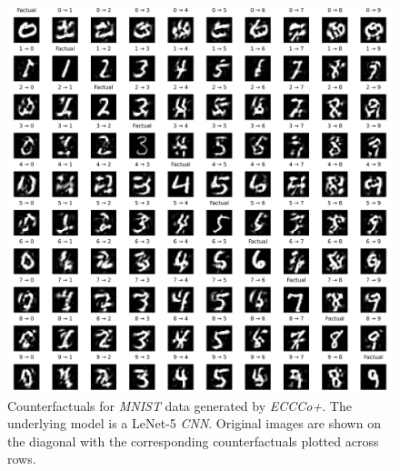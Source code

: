 
\begin{figure}
  \centering
  \includegraphics[width=1.0\linewidth]{../www/mnist_all_lenet_eccco.png}
  \caption{Counterfactuals for \textit{MNIST} data generated by \textit{ECCCo+}. The underlying model is a LeNet-5 \textit{CNN}. Original images are shown on the diagonal with the corresponding counterfactuals plotted across rows.}\label{fig:mnist-eccco-lenet}
\end{figure}

